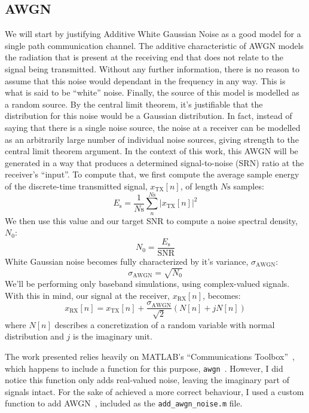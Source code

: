 \subsection{AWGN}

We will start by justifying Additive White Gaussian Noise as a good model for a
single path communication channel. The additive characteristic of AWGN models the
radiation that is present at the receiving end that does not relate to the signal
being transmitted. Without any further information, there is no reason to assume
that this noise would dependant in the frequency in any way. This is what is said
to be ``white'' noise. Finally, the source of this model is modelled as a random
source. By the central limit theorem, it's justifiable that the distribution for
this noise would be a Gaussian distribution. In fact, instead of saying that there
is a single noise source, the noise at a receiver can be modelled as an
arbitrarily large number of individual noise sources, giving strength to the
central limit theorem argument. In the context of this work, this AWGN will be
generated in a way that produces a determined signal-to-noise (SRN) ratio at the
receiver's ``input''. To compute that, we first compute the average sample energy
of the discrete-time transmitted signal, \(x_{\text{TX}}[n]\), of length
\(N{\text{s}}\) samples:
\begin{equation}
    E_{\text{s}} = \frac{1}{N{\text{s}}}\sum^{N{\text{s}}}_{n}
    \left|x_{\text{TX}}[n]\right|^{2}
\end{equation}
We then use this value and our target SNR to compute a noise spectral density,
\(N_0\):
\begin{equation}
    N_0 = \frac{E_{\text{s}}}{\text{SNR}}
\end{equation}
White Gaussian noise becomes fully characterized by it's variance,
\(\sigma_{\text{AWGN}}\):
\begin{equation}
    \sigma_{\text{AWGN}} = \sqrt{N_0}
\end{equation}
We'll be performing only baseband simulations, using complex-valued signals. With
this in mind, our signal at the receiver, \(x_{\text{RX}}[n]\), becomes:
\begin{equation}
    x_{\text{RX}}[n] = x_{\text{TX}}[n] + \frac{\sigma_{\text{AWGN}}}{\sqrt{2}}
    \left( N[n] + jN[n] \right)
\end{equation}
where \(N[n]\) describes a concretization of a random variable with normal
distribution and \(j\) is the imaginary unit.

The work presented relies heavily on MATLAB's ``Communications
Toolbox''~\cite{comtoolbox}, which happens to include a function for this purpose,
\lstinline{awgn}~\cite{awgnfunc}. However, I did notice this function only adds
real-valued noise, leaving the imaginary part of signals intact. For the sake of
achieved a more correct behaviour, I used a custom function to add
AWGN~\cite{addawgnnoise}, included as the {\tt add\_awgn\_noise.m} file.

